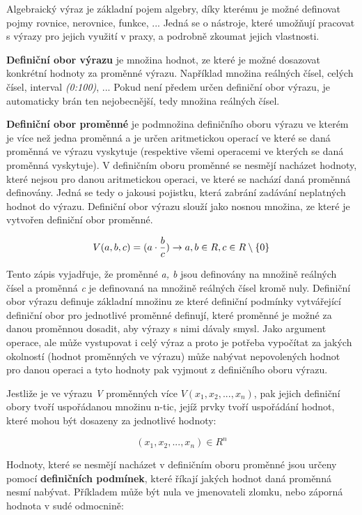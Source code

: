 Algebraický výraz je základní pojem algebry, díky kterému je možné definovat pojmy rovnice, nerovnice, funkce, ... Jedná se o nástroje, které umožňují pracovat s výrazy pro jejich využití v praxy, a podrobně zkoumat jejich vlastnosti.


{\bf Definiční obor výrazu} je množina hodnot, ze které je možné dosazovat konkrétní hodnoty za proměnné výrazu. Například množina reálných čísel, celých čísel, interval {\it (0:100)}, ... Pokud není předem určen definiční obor výrazu, je automaticky brán ten nejobecnější, tedy množina reálných čísel.

{\bf Definiční obor proměnné} je podmnožina definičního oboru výrazu ve kterém je více než jedna proměnná a je určen aritmetickou operací ve které se daná proměnná ve výrazu vyskytuje (respektive všemi operacemi ve kterých se daná proměnná vyskytuje).  V definičním oboru proměnné se nesmějí nacházet hodnoty, které nejsou pro danou aritmetickou operaci, ve které se nachází daná proměnná definovány. Jedná se tedy o jakousi pojistku, která zabrání zadávání neplatných hodnot do výrazu. Definiční obor výrazu slouží jako nosnou množina, ze které je vytvořen definiční obor proměnné.

$$ V(a,b,c) =( a \cdot {b \over c}) \rightarrow a, b \in R, c \in R \setminus \left\{0\right\}  $$

Tento zápis vyjadřuje, že proměnné {\it a, b} jsou definovány na množině reálných čísel a proměnná {\it c} je definovaná na množině reálných čísel kromě nuly. Definiční obor výrazu definuje základní množinu ze které definiční podmínky vytvářející definiční obor pro jednotlivé proměnné definují, které proměnné je možné za danou proměnnou dosadit, aby výrazy s nimi dávaly smysl. Jako argument operace, ale může vystupovat i celý výraz a proto je potřeba vypočítat za jakých okolností (hodnot proměnných ve výrazu) může nabývat nepovolených hodnot pro danou operaci a tyto hodnoty pak vyjmout z definičního oboru výrazu.

Jestliže je ve výrazu {\it V} proměnných více $ V(x_1, x_2 , ... , x_n)$, pak jejich definiční obory tvoří uspořádanou množinu n-tic, jejíž prvky tvoří uspořádání hodnot, které mohou být dosazeny za jednotlivé hodnoty:

$$ (x_1, x_2, ... , x_n) \in R^n $$

Hodnoty, které se nesmějí nacházet v definičním oboru proměnné jsou určeny pomocí {\bf definičních podmínek}, které říkají jakých hodnot daná proměnná nesmí nabývat. Příkladem může být nula ve jmenovateli zlomku, nebo záporná hodnota v sudé odmocnině:

